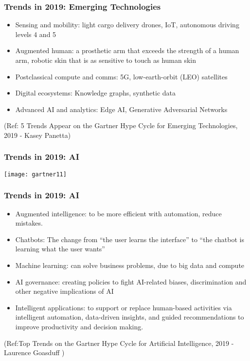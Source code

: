 \begin{frame}[fragile]\frametitle{Trends in 2019: Emerging Technologies}
\begin{itemize}
\item Sensing and mobility: light cargo delivery drones, IoT, autonomous driving levels 4 and 5
\item Augmented human: a prosthetic arm that exceeds the strength of a human arm, robotic skin that is as sensitive to touch as human skin
\item Postclassical compute and comms: 5G,  low-earth-orbit (LEO) satellites 
\item Digital ecosystems: Knowledge graphs, synthetic data
\item Advanced AI and analytics: Edge AI, Generative Adversarial Networks

\end{itemize}


{\tiny (Ref: 5 Trends Appear on the Gartner Hype Cycle for Emerging Technologies, 2019 - Kasey Panetta)}

\end{frame}


\begin{frame}[fragile]\frametitle{Trends in 2019: AI}

\begin{center}
\texttt{[image: gartner11]}
\end{center}

\end{frame}


\begin{frame}[fragile]\frametitle{Trends in 2019: AI}
\begin{itemize}
\item Augmented intelligence: to be more efficient with automation, reduce mistakes.
\item Chatbots: The change from “the user learns the interface” to “the chatbot is learning what the user wants” 
\item Machine learning: can solve business problems, due to big data and compute
\item AI governance: creating policies to fight AI-related biases, discrimination and other negative implications of AI
\item Intelligent applications: to support or replace human-based activities via intelligent automation, data-driven insights, and guided recommendations to improve productivity and decision making. 

\end{itemize}


{\tiny (Ref:Top Trends on the Gartner Hype Cycle for Artificial Intelligence, 2019 - 
Laurence Goasduff )}

\end{frame}

